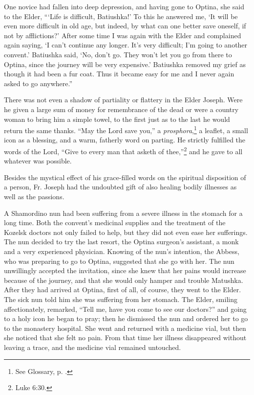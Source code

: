 One novice had fallen into deep depression, and having gone to Optina, she said to the Elder, ```Life is difficult, Batiushka!' To this he answered me, `It will be even more difficult in old age, but indeed, by what can one better save oneself, if not by afflictions?' After some time I was again with the Elder and complained again saying, `I can't continue any longer. It's very difficult; I'm going to another convent.' Batiushka said, `No, don't go. They won't let you go from there to Optina, since the journey will be very expensive.' Batiushka removed my grief as though it had been a fur coat. Thus it became easy for me and I never again asked to go anywhere.''

There was not even a shadow of partiality or flattery in the Elder Joseph. Were he given a large sum of money for remembrance of the dead or were a country woman to bring him a simple towel, to the first just as to the last he would return the same thanks. ``May the Lord save you,'' a \textit{prosphora},\footnote{See Glossary, p. \pageref{prosphora}.} a leaflet, a small icon as a blessing, and a warm, fatherly word on parting. He strictly fulfilled the words of the Lord, ``Give to every man that asketh of thee,''\footnote{Luke 6:30.} and he gave to all whatever was possible.

Besides the mystical effect of his grace-filled words on the spiritual disposition of a person, Fr. Joseph had the undoubted gift of also healing bodily illnesses as well as the passions.

A Shamordino nun had been suffering from a severe illness in the stomach for a long time. Both the convent's medicinal supplies and the treatment of the Kozelsk doctors not only failed to help, but they did not even ease her sufferings. The nun decided to try the last resort, the Optina surgeon's assistant, a monk and a very experienced physician. Knowing of the nun's intention, the Abbess, who was preparing to go to Optina, suggested that she go with her. The nun unwillingly accepted the invitation, since she knew that her pains would increase because of the journey, and that she would only hamper and trouble Matushka. After they had arrived at Optina, first of all, of course, they went to the Elder. The sick nun told him she was suffering from her stomach. The Elder, smiling affectionately, remarked, ``Tell me, have you come to see our doctors?'' and going to a holy icon he began to pray; then he dismissed the nun and ordered her to go to the monastery hospital. She went and returned with a medicine vial, but then she noticed that she felt no pain. From that time her illness disappeared without leaving a trace, and the medicine vial remained untouched.

